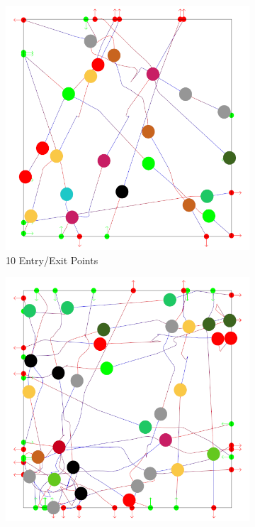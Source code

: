 \begin{figure}[t]
	\centering
	\begin{subfigure}[b]{0.24\linewidth}
		\includegraphics[width=\linewidth]{images/res-10-entry-exit.png}
		\caption{10 Entry/Exit Points}
	 \end{subfigure}
	 \begin{subfigure}[b]{0.24\linewidth}
		\includegraphics[width=\linewidth]{images/res-20-entry-exit.png}

\end{subfigure}
\end{figure}
